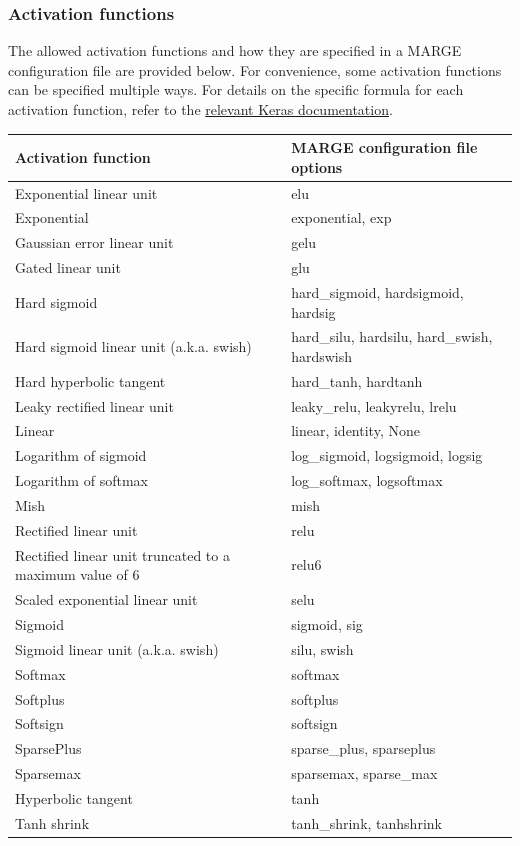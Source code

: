 \documentclass[letterpaper, 12pt]{article}
\begin{document}
\subsubsection{Activation functions}
\label{sec:activations}

The allowed activation functions and how they are specified in a MARGE 
configuration file are provided below.  For convenience, some activation 
functions can be specified multiple ways.  
For details on the specific formula for each activation function, refer to the 
\href{https://keras.io/api/layers/activations/}{relevant Keras documentation}.

\begin{center}
	\begin{tabular}{| l | l |}
		\hline
		Activation function & MARGE configuration file options \\
		\hline\hline
		Exponential linear unit & elu \\
		Exponential & exponential, exp \\
		Gaussian error linear unit & gelu \\
		Gated linear unit & glu \\
		Hard sigmoid & hard\_sigmoid, hardsigmoid, hardsig \\
		Hard sigmoid linear unit (a.k.a. swish) & hard\_silu, hardsilu, hard\_swish, hardswish \\
		Hard hyperbolic tangent & hard\_tanh, hardtanh \\
		Leaky rectified linear unit & leaky\_relu, leakyrelu, lrelu \\
		Linear & linear, identity, None \\
		Logarithm of sigmoid & log\_sigmoid, logsigmoid, logsig \\
		Logarithm of softmax & log\_softmax, logsoftmax \\
		Mish & mish \\
		Rectified linear unit & relu \\
		Rectified linear unit truncated to a maximum value of 6 & relu6 \\
		Scaled exponential linear unit & selu \\
		Sigmoid & sigmoid, sig \\
		Sigmoid linear unit (a.k.a. swish) & silu, swish \\
		Softmax & softmax \\
		Softplus & softplus \\
		Softsign & softsign \\
		SparsePlus & sparse\_plus, sparseplus \\
		Sparsemax & sparsemax, sparse\_max \\
		Hyperbolic tangent & tanh \\
		Tanh shrink & tanh\_shrink, tanhshrink \\
		\hline
	\end{tabular}
\end{center}
\end{document}
